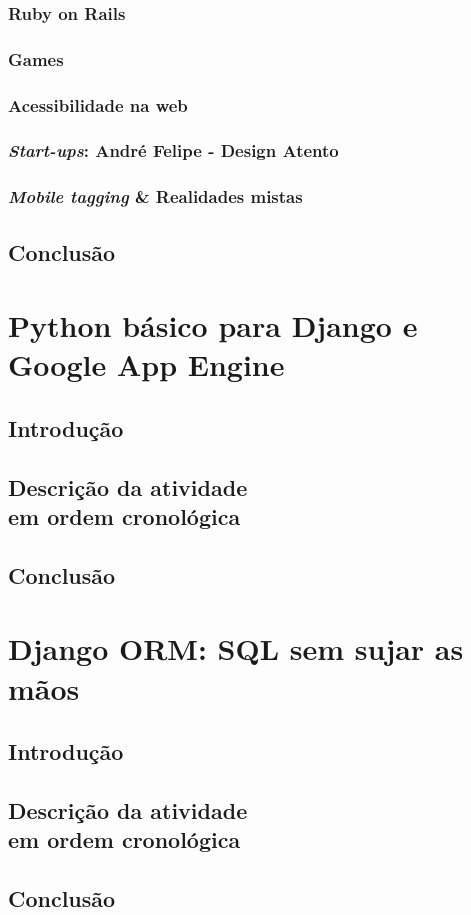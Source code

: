 \documentclass[a4paper]{report}
\begin{document}
            \subsection{Ruby on Rails}

            \subsection{Games}

            \subsection{Acessibilidade na web}

            \subsection{\emph{Start-ups}: Andr\'{e} Felipe - Design Atento}

            \subsection{\emph{Mobile tagging} \& Realidades mistas}

        \section{Conclus\~{a}o}

    \chapter[Python b\'{a}sico]{Python b\'{a}sico para Django e Google App Engine}

        \section{Introdu\c{c}\~{a}o}

        \section[Descri\c{c}\~{a}o atividade]{Descri\c{c}\~{a}o da atividade
        \\em ordem cronol\'{o}gica}

        \section{Conclus\~{a}o}

    \chapter[Django ORM]{Django ORM: SQL sem sujar as m\~{a}os}

        \section{Introdu\c{c}\~{a}o}

        \section[Descri\c{c}\~{a}o atividade]{Descri\c{c}\~{a}o da atividade
        \\em ordem cronol\'{o}gica}

        \section{Conclus\~{a}o}
\end{document}
